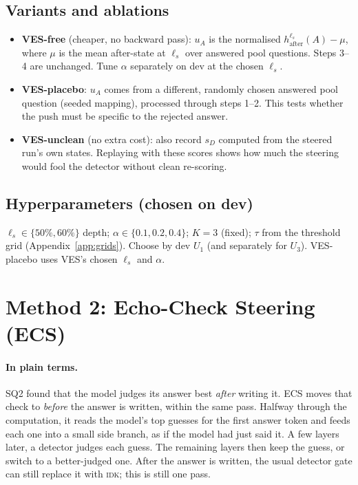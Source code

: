 \documentclass[11pt]{article}
\newcommand{\IDK}{\textsc{idk}}
\newcommand{\sD}{s_{D}}
\begin{document}
\subsection{Variants and ablations}\label{sec:vesabl}
\begin{itemize}
  \item \textbf{VES-free} (cheaper, no backward pass): $u_A$ is the normalised
        $h^{\ell_s}_{\mathrm{after}}(A) - \mu$, where $\mu$ is the mean after-state at $\ell_s$ over answered
        pool questions. Steps 3--4 are unchanged. Tune $\alpha$ separately on dev at the chosen $\ell_s$.
  \item \textbf{VES-placebo}: $u_A$ comes from a different, randomly chosen answered pool question
        (seeded mapping), processed through steps 1--2. This tests whether the push must be specific to
        the rejected answer.
  \item \textbf{VES-unclean} (no extra cost): also record $\sD$ computed from the steered run's own states.
        Replaying with these scores shows how much the steering would fool the detector without clean
        re-scoring.
\end{itemize}

\subsection{Hyperparameters (chosen on dev)}
$\ell_s \in \{50\%, 60\%\}$ depth; $\alpha \in \{0.1, 0.2, 0.4\}$; $K = 3$ (fixed); $\tau$ from the
threshold grid (Appendix~\ref{app:grids}). Choose by dev $U_1$ (and separately for $U_3$). VES-placebo uses
VES's chosen $\ell_s$ and $\alpha$.

\section{Method 2: Echo-Check Steering (ECS)}

\paragraph{In plain terms.} SQ2 found that the model judges its answer best \emph{after} writing it. ECS
moves that check to \emph{before} the answer is written, within the same pass. Halfway through the
computation, it reads the model's top guesses for the first answer token and feeds each one into a small side
branch, as if the model had just said it. A few layers later, a detector judges each guess. The remaining
layers then keep the guess, or switch to a better-judged one. After the answer is written, the usual detector
gate can still replace it with \IDK; this is still one pass.
\end{document}
